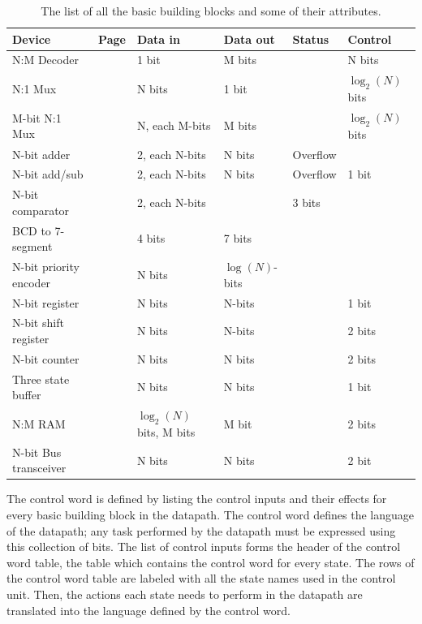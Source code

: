\begin{table}
{\small
\begin{tabular}{|l|l|l|l|l|l|} \hline
Device      & Page & Data in     & Data out & Status   & Control \\ \hline
N:M Decoder & \pageref{page:dec}          & 1 bit       & M bits  & 	& N bits  \\ \hline
N:1 Mux     & \pageref{page:mux}          & N bits  & 1 bit    & 	&  $\log_2(N)$ bits  \\ \hline
M-bit N:1 Mux   & \pageref{page:wmu}          & N, each M-bits  & M bits & 	&  $\log_2(N)$ bits  \\ \hline
N-bit adder & \pageref{page:add}          & 2, each N-bits & N bits & Overflow &   \\ \hline
N-bit add/sub & \pageref{page:as}         & 2, each N-bits & N bits & Overflow & 1 bit  \\ \hline
N-bit comparator & \pageref{page:com}     & 2, each N-bits &  & 3 bits &   \\ \hline
BCD to 7-segment & \pageref{page:7seg}  & 4 bits & 7 bits & &   \\ \hline
N-bit priority encoder & \pageref{page:prior}  & N bits & $\log(N)$-bits & &   \\ \hline
N-bit register & \pageref{page:reg}       & N bits & N-bits &  & 1 bit  \\ \hline
N-bit shift register & \pageref{page:shi} & N bits & N-bits &  & 2 bits  \\ \hline
N-bit counter & \pageref{page:counter}        & N bits & N bits &  & 2 bits  \\ \hline
Three state buffer& \pageref{page:tsb}      & N bits & N bits & & 1 bit  \\ \hline
N:M RAM & \pageref{page:ram}              & $\log_2(N)$ bits, M bits & M bit & & 2 bits  \\ \hline
N-bit Bus transceiver & \pageref{page:bus}      & N bits & N bits & & 2 bit  \\ \hline
\end{tabular}
}
\caption{The list of all the basic building blocks and some of their attributes.}
\label{table:bbblist}
\end{table}
\label{page:boxlist}

The control word is defined by listing the control inputs and their effects
for every basic building block in the datapath.  The control word defines 
the language of the datapath; any task performed by the datapath must
be expressed using this collection of bits.  The list of control inputs
forms the header of the control word table, the table which 
contains the control word for every state.  The rows of the control word 
table are labeled with all the state names used in the control unit.  Then,
the actions each state needs to perform in the datapath are translated 
into the language defined by the control word.  

